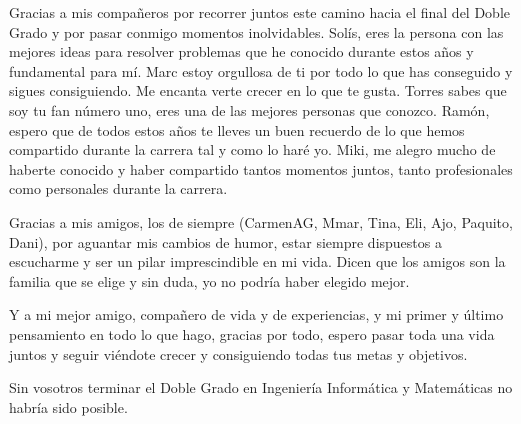 Gracias a mis compañeros por recorrer juntos este camino hacia el final del Doble Grado y por pasar conmigo momentos inolvidables.
Solís, eres la persona con las mejores ideas para resolver problemas que he conocido durante estos años y fundamental para mí.
Marc estoy orgullosa de ti por todo lo que has conseguido y sigues consiguiendo. Me encanta verte crecer en lo que te gusta.
Torres sabes que soy tu fan número uno, eres una de las mejores personas que conozco.
Ramón, espero que de todos estos años te lleves un buen recuerdo de lo que hemos compartido durante la carrera tal y como lo haré yo.
Miki, me alegro mucho de haberte conocido y haber compartido tantos momentos juntos, tanto profesionales como personales durante la carrera.
\vspace{0.5cm}

Gracias a mis amigos, los de siempre (CarmenAG, Mmar, Tina, Eli, Ajo, Paquito, Dani), por aguantar mis cambios de humor, estar siempre dispuestos a escucharme y ser un pilar imprescindible en mi vida.
Dicen que los amigos son la familia que se elige y sin duda, yo no podría haber elegido mejor.
\vspace{0.5cm}

Y a mi mejor amigo, compañero de vida y de experiencias, y mi primer y último pensamiento en todo lo que hago, gracias por todo, espero pasar toda una vida juntos y seguir viéndote crecer y consiguiendo todas tus metas y objetivos.
\vspace{0.5cm}

Sin vosotros terminar el Doble Grado en Ingeniería Informática y Matemáticas no habría sido posible.